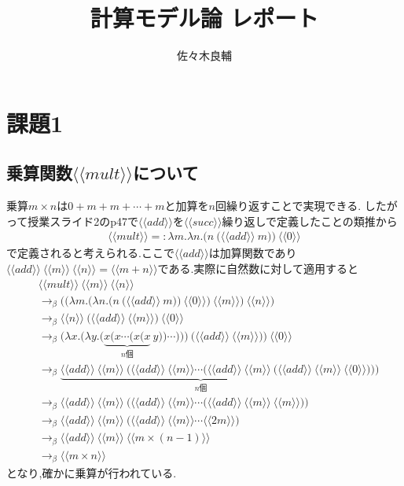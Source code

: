 \documentclass[uplatex,a4j,11pt,dvipdfmx]{jsarticle}
\newcommand{\llr}{\langle\langle}
\newcommand{\rrr}{\rangle\rangle}
\begin{document}
\title{計算モデル論 レポート}
\author{佐々木良輔}
\date{}
\maketitle
\section*{課題1}
\subsection*{乗算関数$\llr mult\rrr$について}
乗算$m\times n$は$0+m+m+\cdots+m$と加算を$n$回繰り返すことで実現できる.
したがって授業スライド2のp47で$\llr add\rrr$を$\llr succ\rrr$繰り返しで定義したことの類推から
\begin{align*}
  \llr mult\rrr=:\lambda m.\lambda n.\bigg(n\ \Big(\llr add\rrr\ m\Big)\bigg)\ \llr 0\rrr
\end{align*}
で定義されると考えられる.\cite{utokyo}\cite{jugyo3}ここで$\llr add\rrr$は加算関数であり$\llr add\rrr\ \llr m\rrr\ \llr n\rrr=\llr m+n\rrr$である.実際に自然数に対して適用すると
\begin{align*}
  &\llr mult\rrr\ \llr m\rrr\ \llr n\rrr\\
  &\rightarrow_\beta \Bigg(\bigg(\lambda m.\Big(\lambda n.\Big(n\ \Big(\llr add\rrr\ m\Big)\Big)\ \llr 0\rrr\Big)\ \llr m\rrr\bigg)\ \llr n\rrr\Bigg)\\
  &\rightarrow_\beta \llr n\rrr\ \Big(\llr add\rrr\ \llr m\rrr\Big)\ \llr 0\rrr\\
  &\rightarrow_\beta \Bigg(\lambda x.\bigg(\lambda y.\Big(\underbrace{x(x\cdots(x(x}_{n個}\ y))\cdots)\Big)\bigg)\ \Big(\llr add\rrr\ \llr m\rrr\Big)\Bigg)\ \llr 0\rrr\\
  &\rightarrow_\beta \underbrace{\llr add\rrr\ \llr m\rrr\ \Bigg(\llr add\rrr\ \llr m\rrr\cdots\bigg(\llr add\rrr\ \llr m\rrr\ \Big(\llr add\rrr\ \llr m\rrr}_{n個}\ \llr 0\rrr\Big)\bigg)\Bigg)\\
  &\rightarrow_\beta \llr add\rrr\ \llr m\rrr\ \bigg(\llr add\rrr\ \llr m\rrr\cdots\Big(\llr add\rrr\ \llr m\rrr\ \llr m\rrr\Big)\bigg)\\
  &\rightarrow_\beta \llr add\rrr\ \llr m\rrr\ \Big(\llr add\rrr\ \llr m\rrr\cdots\llr 2m\rrr\Big)\\
  &\rightarrow_\beta \llr add\rrr\ \llr m\rrr\ \llr m\times(n-1)\rrr\\
  &\rightarrow_\beta\llr m\times n\rrr
\end{align*}
となり,確かに乗算が行われている.
\end{document}
